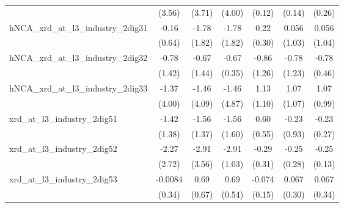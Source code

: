 {\begin{tabular}{l*{6}{c}}
                    &      (3.56)         &      (3.71)         &      (4.00)         &      (0.12)         &      (0.14)         &      (0.26)         \\
\addlinespace
hNCA\_xrd\_at\_l3\_industry\_2dig31&       -0.16         &       -1.78         &       -1.78         &        0.22         &       0.056         &       0.056         \\
                    &      (0.64)         &      (1.82)         &      (1.82)         &      (0.30)         &      (1.03)         &      (1.04)         \\
\addlinespace
hNCA\_xrd\_at\_l3\_industry\_2dig32&       -0.78         &       -0.67         &       -0.67\sym{*}  &       -0.86         &       -0.78         &       -0.78\sym{*}  \\
                    &      (1.42)         &      (1.44)         &      (0.35)         &      (1.26)         &      (1.23)         &      (0.46)         \\
\addlinespace
hNCA\_xrd\_at\_l3\_industry\_2dig33&       -1.37         &       -1.46         &       -1.46         &        1.13         &        1.07         &        1.07         \\
                    &      (4.00)         &      (4.09)         &      (4.87)         &      (1.10)         &      (1.07)         &      (0.99)         \\
\addlinespace
xrd\_at\_l3\_industry\_2dig51&       -1.42         &       -1.56         &       -1.56         &        0.60         &       -0.23         &       -0.23         \\
                    &      (1.38)         &      (1.37)         &      (1.60)         &      (0.55)         &      (0.93)         &      (0.27)         \\
\addlinespace
xrd\_at\_l3\_industry\_2dig52&       -2.27         &       -2.91         &       -2.91\sym{***}&       -0.29         &       -0.25         &       -0.25\sym{*}  \\
                    &      (2.72)         &      (3.56)         &      (1.03)         &      (0.31)         &      (0.28)         &      (0.13)         \\
\addlinespace
xrd\_at\_l3\_industry\_2dig53&     -0.0084         &        0.69         &        0.69         &      -0.074         &       0.067         &       0.067         \\
                    &      (0.34)         &      (0.67)         &      (0.54)         &      (0.15)         &      (0.30)         &      (0.34)         \\

\end{tabular}}
